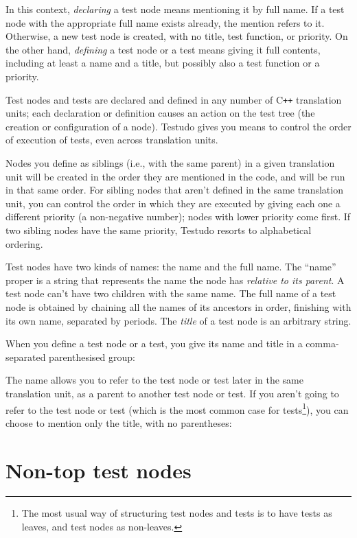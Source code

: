\documentclass[twoside, a4paper, article]{memoir}
\newcommand\typesetexample[1]{%
  \typesetexamplesource{#1}
}
\providecommand\typesetexamplesource[1]{%
}
\newcommand*\Cpp{C\texttt{++}}
\begin{document}
In this context, \emph{declaring} a test node means mentioning it by full name.
If a test node with the appropriate full name exists already, the mention
refers to it.  Otherwise, a new test node is created, with no title, test
function, or priority.  On the other hand, \emph{defining} a test node or a
test means giving it full contents, including at least a name and a title, but
possibly also a test function or a priority.

Test nodes and tests are declared and defined in any number of \Cpp{}
translation units; each declaration or definition causes an action on the test
tree (the creation or configuration of a node).  Testudo gives you means to
control the order of execution of tests, even across translation units.

Nodes you define as siblings (i.e., with the same parent) in a given
translation unit will be created in the order they are mentioned in the code,
and will be run in that same order.  For sibling nodes that aren't defined in
the same translation unit, you can control the order in which they are executed
by giving each one a different priority (a non-negative number); nodes with
lower priority come first.  If two sibling nodes have the same priority,
Testudo resorts to alphabetical ordering.

Test nodes have two kinds of names: the name and the full name.  The ``name''
proper is a string that represents the name the node has \emph{relative to its
  parent}.  A test node can't have two children with the same name.  The full
name of a test node is obtained by chaining all the names of its ancestors in
order, finishing with its own name, separated by periods.  The \emph{title} of
a test node is an arbitrary string.

When you define a test node or a test, you give its name and title in a
comma-separated parenthesised group:

\typesetexample{define-test-node-no-report}

The name allows you to refer to the test node or test later in the same
translation unit, as a parent to another test node or test.  If you aren't
going to refer to the test node or test (which is the most common case for
tests\footnote{The most usual way of structuring test nodes and tests is to
  have tests as leaves, and test nodes as non-leaves.}), you can choose to
mention only the title, with no parentheses:

\typesetexample{define-test-ellipses}

\section{Non-top test nodes}
\label{sec:non-top-test-nodes}
\end{document}
